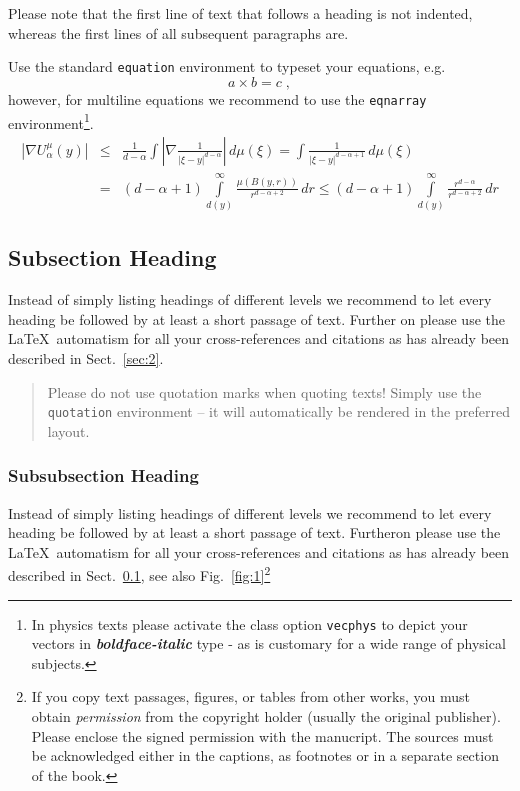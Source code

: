 \documentclass[graybox,envcountchap,sectrefs]{svmono}
\begin{document}
Please note that the first line of text that follows a heading is not indented, whereas the first lines of all subsequent paragraphs are.

Use the standard \verb|equation| environment to typeset your equations, e.g.
%
\begin{equation}
	a \times b = c\;,
\end{equation}
%
however, for multiline equations we recommend to use the \verb|eqnarray| environment\footnote{In physics texts please activate the class option \texttt{vecphys} to depict your vectors in \textbf{\itshape boldface-italic} type - as is customary for a wide range of physical subjects.}.
\begin{eqnarray}\nonumber
	\left|\nabla U_{\alpha}^{\mu}(y)\right| &\le&\frac1{d-\alpha}\int
	\left|\nabla\frac1{|\xi-y|^{d-\alpha}}\right|\,d\mu(\xi) =
	\int \frac1{|\xi-y|^{d-\alpha+1}} \,d\mu(\xi)\qquad  \\
	&=&(d-\alpha+1) \int\limits_{d(y)}^\infty
	\frac{\mu(B(y,r))}{r^{d-\alpha+2}}\,dr \le (d-\alpha+1)
	\int\limits_{d(y)}^\infty \frac{r^{d-\alpha}}{r^{d-\alpha+2}}\,dr
	\label{eq:01}
\end{eqnarray}

\enlargethispage{24pt}

\subsection{Subsection Heading}
\label{subsec:2}
Instead of simply listing headings of different levels we recommend to let every heading be followed by at least a short passage of text. Further on please use the \LaTeX\ automatism for all your cross-references and citations as has already been described in Sect.~\ref{sec:2}.

\begin{quotation}
	Please do not use quotation marks when quoting texts! Simply use the \verb|quotation| environment -- it will automatically be rendered in the preferred layout.
\end{quotation}


\subsubsection{Subsubsection Heading}
Instead of simply listing headings of different levels we recommend to let every heading be followed by at least a short passage of text. Furtheron please use the \LaTeX\ automatism for all your cross-references and citations as has already been described in Sect.~\ref{subsec:2}, see also Fig.~\ref{fig:1}\footnote{If you copy text passages, figures, or tables from other works, you must obtain \textit{permission} from the copyright holder (usually the original publisher). Please enclose the signed permission with the manucript. The sources must be acknowledged either in the captions, as footnotes or in a separate section of the book.}
\end{document}
